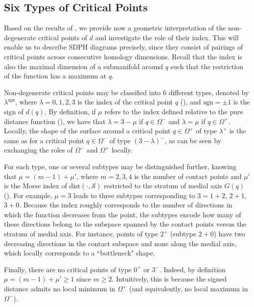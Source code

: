 \documentclass[11pt]{article}
\newcommand{\sgn}{\mathrm{sgn}}
\newcommand{\W}{\Omega}
\newcommand{\dist}{\mathrm{dist}}
\newcommand{\Surf}{\mathcal{S}}
\theoremstyle{plain}
\theoremstyle{definition}
\theoremstyle{remark}
\begin{document}
	\subsection{Six Types of Critical Points}
	\label{sec:6_types_crit_pts}
	
	Based on the results of , we provide now a geometric interpretation of the non-degenerate critical points of $d$ and investigate the role of their index. This will enable us to describe SDPH diagrams precisely, since they consist of pairings of critical points across consecutive homology dimensions. Recall that the index is also the maximal dimension of a submanifold around $q$ such that the restriction of the function has a maximum at $q$.
	
	Non-degenerate critical points may be classified into $6$ different types, denoted by $\lambda^\sgn$, where $\lambda = 0,1,2,3$ is the index of the critical point $q$ (), and $\sgn = \pm 1$ is the sign of $d(q)$.
	By definition, if $\mu$ refers to the index defined relative  to the pure distance function (), we have that $\lambda = 3 - \mu$ if $q \in \W^-$ and $\lambda = \mu$ if $q \in \W^+$. 
	Locally, the shape of the surface around a critical point $q \in \W^+$ of type $\lambda^+$ is the same as for a critical point $q \in \W^-$ of type $(3-\lambda)^-$, as can be seen by exchanging the roles of $\W^-$ and $\W^+$ locally.
	
	For each type, one or several subtypes may be distinguished further, knowing that $\mu = (m - 1) + \mu'$, where $m = 2,3,4$ is the number of contact points and $\mu'$ is the Morse index of $\dist(\cdot, \Surf)$ restricted to the stratum of medial axis $G(q)$ (). For example, $\mu = 3$ leads to three subtypes corresponding to $3 = 1 + 2$, $2 + 1$, $3 + 0$. Because the index roughly corresponds to the number of directions in which the function decreases from the point, the subtypes encode how many of these directions belong to the subspace spanned by the contact points versus the stratum of medial axis. For instance, points of type $2^+$ (subtype $2 + 0$) have two decreasing directions in the contact subspace and none along the medial axis, which locally corresponds to a ``bottleneck" shape.
	
	Finally, there are no critical points of type $0^+$ or $3^-$. Indeed, by definition $\mu = (m - 1) + \mu' \geq 1$ since $m \geq 2$. Intuitively, this is because the signed distance admits no local minimum in $\W^+$ (and equivalently, no local maximum in $\W^-$).
	
\end{document}
